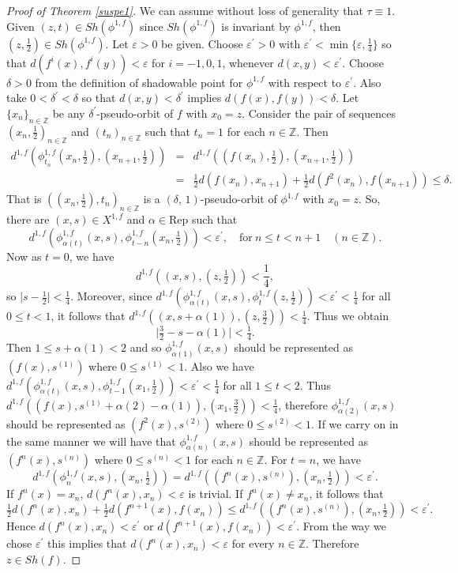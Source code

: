 \documentclass{amsart}
\theoremstyle{definition}
\newcommand{\ep}{\varepsilon}
\begin{document}
\begin{proof}[Proof of Theorem \ref{suspe1}]
	We can assume without loss of generality that $\tau\equiv 1$. Given $(z,t)\in Sh(\phi^{1,f})$ since $Sh(\phi^{1,f})$ is invariant by $\phi^{1,f}$, then $(z,\frac{1}{2})\in Sh(\phi^{1,f})$. Let $\ep>0$ be given. Choose $\ep^{\prime}>0$ with $\ep^{\prime}<\min\{\ep,\frac{1}{4}\}$ so that $d(f^i(x),f^i(y))<\ep$ for $i=-1,0,1$, whenever $d(x,y)<\ep^{\prime}$. Choose $\delta>0$ from the definition of shadowable point for $\phi^{1,f}$ with respect to $\ep^{\prime}$. Also take $0<\delta^{\prime}<\delta$ so that $d(x,y)<\delta^{\prime}$ implies $d(f(x),f(y))<\delta$. Let $\{ x_n\}_{n\in \mathbb{Z}}$ be any $\delta^{\prime}$-pseudo-orbit of $f$ with $x_0=z$. Consider the pair of sequences $(x_n,\frac{1}{2})_{n\in \mathbb{Z}}$ and $(t_n)_{n\in \mathbb{Z}}$ such that $t_n=1$ for each $n\in \mathbb{Z}$. Then  
	\begin{eqnarray*}
		d^{1,f}(\phi^{1,f}_{t_n}(x_n,\tfrac{1}{2}),(x_{n+1},\tfrac{1}{2}))&=& d^{1,f}((f(x_n),\tfrac{1}{2}),(x_{n+1},\tfrac{1}{2}))\\
		&=& \tfrac{1}{2}d(f(x_{n}),x_{n+1})+\tfrac{1}{2}d(f^{2}(x_{n}),f(x_{n+1})) \leq \delta.
	\end{eqnarray*}
	That is $((x_n,\tfrac{1}{2}),t_n)_{n\in \mathbb{Z}}$ is a $(\delta,\, 1)$-pseudo-orbit of $\phi^{1,f}$ with $x_0=z$. So, there are $(x,s)\in X^{1,f}$ and $\alpha\in \mathrm{Rep}$ such that 
	$$d^{1,f}(\phi^{1,f}_{\alpha(t)}(x,s),\phi^{1,f}_{t-n}(x_n,\tfrac{1}{2}))<\ep^{\prime},\quad \mbox{for}\ n\leq t<n+1\quad (n\in \mathbb{Z}).$$
	Now as $t=0$, we have $$d^{1,f}((x,s),(z,\tfrac{1}{2}))<\frac{1}{4},$$ so $\vert s-\frac{1}{2}\vert<\frac{1}{4}$. Moreover, since $d^{1,f}(\phi^{1,f}_{\alpha(t)}(x,s),\phi^{1,f}_{t}(z,\frac{1}{2}))<\ep^{\prime}<\frac{1}{4}$ for all $0\leq t<1$, it follows that $d^{1,f}((x,s+\alpha(1)),(z,\frac{3}{2}))<\frac{1}{4}$. Thus we obtain  $$\vert \tfrac{3}{2}-s-\alpha(1)\vert<\tfrac{1}{4}.$$
	Then $1\leq s+\alpha(1)<2$ and so $\phi^{1,f}_{\alpha(1)}(x,s)$ should be represented as $(f(x),s^{(1)})$ where $0\leq s^{(1)}<1$. Also we have $d^{1,f}(\phi^{1,f}_{\alpha(t)}(x,s),\phi^{1,f}_{t-1}(x_1,\frac{1}{2}))<\ep^{\prime}<\frac{1}{4}$ for all $1\leq t<2$. Thus $d^{1,f}((f(x),s^{(1)}+\alpha(2)-\alpha(1)),(x_1,\frac{3}{2}))<\frac{1}{4}$, therefore $\phi^{1,f}_{\alpha(2)}(x,s)$ should be represented as $(f^2(x),s^{(2)})$ where $0\leq s^{(2)}<1$. If we carry on in the same manner we will have that $\phi^{1,f}_{\alpha(n)}(x,s)$ should be represented as $(f^n(x),s^{(n)})$ where $0\leq s^{(n)}<1$ for each $n\in \mathbb{Z}$.
	For $t=n$, we have $$d^{1,f}(\phi^{1,f}_{n}(x,s),(x_n,\tfrac{1}{2}))=d^{1,f}((f^n(x),s^{(n)}),(x_n,\tfrac{1}{2}))<\ep^{\prime}.$$ If $f^n(x)=x_n$,  $d(f^n(x),x_n)<\ep$ is trivial. If $f^n(x)\neq x_n$, it follows that 
	$$\tfrac{1}{2}d(f^n(x),x_n)+\tfrac{1}{2}d(f^{n+1}(x),f(x_n))\leq d^{1,f}((f^n(x),s^{(n)}),(x_n,\tfrac{1}{2}))<\ep^{\prime}.$$
	Hence $d(f^n(x),x_n)<\ep^{\prime}$ or $d(f^{n+1}(x),f(x_n))<\ep^{\prime}.$ From the way we chose $\ep^{\prime}$ this implies that $d(f^{n}(x),x_n)<\ep$ for every $n\in \mathbb{Z}$. Therefore $z\in Sh(f)$.
	

\end{proof}
\end{document}
